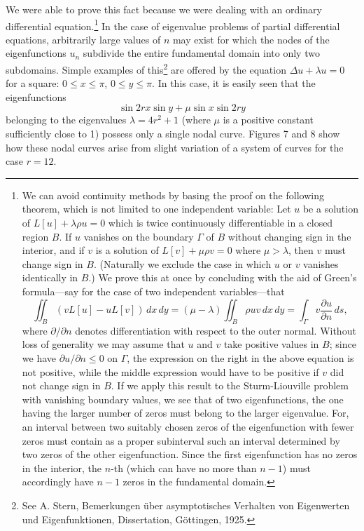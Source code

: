 We were able to prove this fact because we were dealing with an ordinary differential equation.\footnote{We can avoid continuity methods by basing the proof on the following theorem, which is not limited to one independent variable: Let $u$ be a solution of $L[u]+\lambda\rho u=0$ which is twice continuously differentiable in a closed region $B$. If $u$ vanishes on the boundary $\Gamma$ of $B$ without changing sign in the interior, and if $v$ is a solution of $L[v]+\mu\rho v=0$ where $\mu>\lambda$, then $v$ must change sign in $B$. (Naturally we exclude the case in which $u$ or $v$ vanishes identically in $B$.) We prove this at once by concluding with the aid of Green's formula---say for the case of two independent variables---that
\[
\iint_B(vL[u]-uL[v])\,dx\,dy=(\mu-\lambda)\iint_B\rho uv\,dx\,dy
=\int_\Gamma v\frac{\partial u}{\partial n}\,ds,
\]
where $\partial/\partial n$ denotes differentiation with respect to the outer normal. Without loss of generality we may assume that $u$ and $v$ take positive values in $B$; since we have $\partial u/\partial n\le0$ on $\Gamma$, the expression on the right in the above equation is not positive, while the middle expression would have to be positive if $v$ did not change sign in $B$. If we apply this result to the Sturm-Liouville problem with vanishing boundary values, we see that of two eigenfunctions, the one having the larger number of zeros must belong to the larger eigenvalue. For, an interval between two suitably chosen zeros of the eigenfunction with fewer zeros must contain as a proper subinterval such an interval determined by two zeros of the other eigenfunction. Since the first eigenfunction has no zeros in the interior, the $n$-th (which can have no more than $n-1$) must accordingly have $n-1$ zeros in the fundamental domain.} In the case of eigenvalue problems of partial differential equations, arbitrarily large values of $n$ may exist for which the nodes of the eigenfunctions $u_n$ subdivide the entire fundamental domain into only two subdomains. Simple examples of this\footnote{See A. Stern, Bemerkungen über asymptotisches Verhalten von Eigenwerten und Eigenfunktionen, Dissertation, Göttingen, 1925.} are offered by the equation $\Delta u+\lambda u=0$ for a square: $0\le x\le\pi$, $0\le y\le\pi$. In this case, it is easily seen that the eigenfunctions
\[
\sin 2rx\sin y+\mu\sin x\sin 2ry
\]
belonging to the eigenvalues $\lambda=4r^2+1$ (where $\mu$ is a positive constant sufficiently close to 1) possess only a single nodal curve. Figures 7 and 8 show how these nodal curves arise from slight variation of a system of curves for the case $r=12$.

